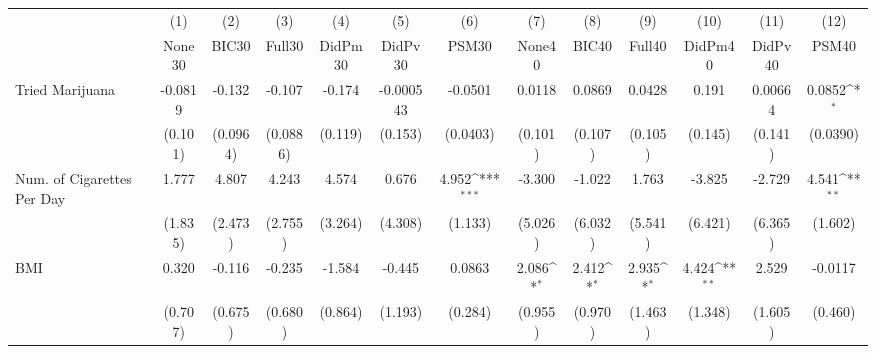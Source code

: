 {
\def\sym#1{\ifmmode^{#1}\else\(^{#1}\)\fi}
\begin{tabular}{l*{12}{c}}
\toprule
            &\multicolumn{1}{c}{(1)}&\multicolumn{1}{c}{(2)}&\multicolumn{1}{c}{(3)}&\multicolumn{1}{c}{(4)}&\multicolumn{1}{c}{(5)}&\multicolumn{1}{c}{(6)}&\multicolumn{1}{c}{(7)}&\multicolumn{1}{c}{(8)}&\multicolumn{1}{c}{(9)}&\multicolumn{1}{c}{(10)}&\multicolumn{1}{c}{(11)}&\multicolumn{1}{c}{(12)}\\
            &\multicolumn{1}{c}{None30}&\multicolumn{1}{c}{BIC30}&\multicolumn{1}{c}{Full30}&\multicolumn{1}{c}{DidPm30}&\multicolumn{1}{c}{DidPv30}&\multicolumn{1}{c}{PSM30}&\multicolumn{1}{c}{None40}&\multicolumn{1}{c}{BIC40}&\multicolumn{1}{c}{Full40}&\multicolumn{1}{c}{DidPm40}&\multicolumn{1}{c}{DidPv40}&\multicolumn{1}{c}{PSM40}\\
\midrule
Tried Marijuana&     -0.0819         &      -0.132         &      -0.107         &      -0.174         &   -0.000543         &     -0.0501         &      0.0118         &      0.0869         &      0.0428         &       0.191         &     0.00664         &      0.0852\sym{*}  \\
            &     (0.101)         &    (0.0964)         &    (0.0886)         &     (0.119)         &     (0.153)         &    (0.0403)         &     (0.101)         &     (0.107)         &     (0.105)         &     (0.145)         &     (0.141)         &    (0.0390)         \\
\addlinespace
Num. of Cigarettes Per Day&       1.777         &       4.807         &       4.243         &       4.574         &       0.676         &       4.952\sym{***}&      -3.300         &      -1.022         &       1.763         &      -3.825         &      -2.729         &       4.541\sym{**} \\
            &     (1.835)         &     (2.473)         &     (2.755)         &     (3.264)         &     (4.308)         &     (1.133)         &     (5.026)         &     (6.032)         &     (5.541)         &     (6.421)         &     (6.365)         &     (1.602)         \\
\addlinespace
BMI         &       0.320         &      -0.116         &      -0.235         &      -1.584         &      -0.445         &      0.0863         &       2.086\sym{*}  &       2.412\sym{*}  &       2.935\sym{*}  &       4.424\sym{**} &       2.529         &     -0.0117         \\
            &     (0.707)         &     (0.675)         &     (0.680)         &     (0.864)         &     (1.193)         &     (0.284)         &     (0.955)         &     (0.970)         &     (1.463)         &     (1.348)         &     (1.605)         &     (0.460)         \\

\end{tabular}}
